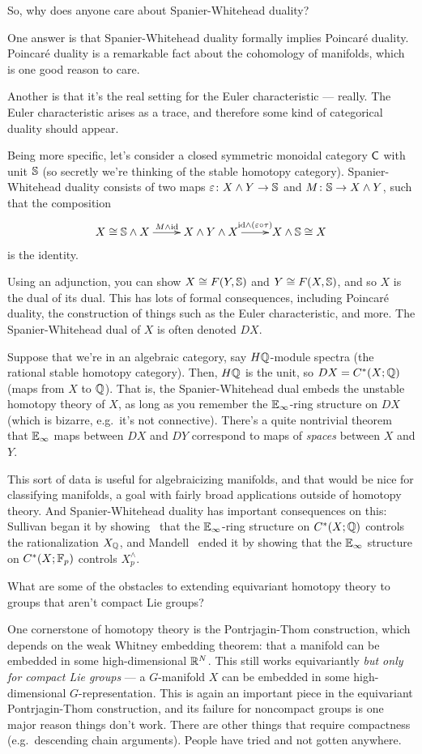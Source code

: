 \begin{ques}
So, why does anyone care about Spanier-Whitehead duality?
\end{ques}
One answer is that Spanier-Whitehead duality formally implies Poincaré duality. Poincaré duality is a remarkable
fact about the cohomology of manifolds, which is one good reason to care.

Another is that it's the real setting for the Euler characteristic --- really. The Euler characteristic arises as a
trace, and therefore some kind of categorical duality should appear.

Being more specific, let's consider a closed symmetric monoidal category $\mathsf C$ with unit $\mathbb S$ (so secretly we're
thinking of the stable homotopy category). Spanier-Whitehead duality consists of two maps $\varepsilon\colon X\wedge
Y\to\mathbb S$ and $M\colon \mathbb S\to X\wedge Y$, such that the composition
\[\xymatrix{
	X\cong \Sph\wedge X\ar[r]^{M\wedge\id} & X\wedge Y\wedge X\ar[r]^{\id\wedge(\e\circ\tau)} &X\wedge\Sph\cong X
}\]
is the identity.

Using an adjunction, you can show $X\cong F(Y,\mathbb S)$ and $Y\cong F(X,\mathbb S)$, and so $X$ is the dual of its dual.
This has lots of formal consequences, including Poincaré duality, the construction of things such as the Euler
characteristic, and more. The Spanier-Whitehead dual of $X$ is often denoted $DX$.

Suppose that we're in an algebraic category, say $H\mathbb Q$-module spectra (the rational stable homotopy category).
Then, $H\mathbb Q$ is the unit, so $DX = C^*(X;\mathbb Q)$ (maps from $X$ to $\mathbb Q$). That is, the Spanier-Whitehead dual embeds
the unstable homotopy theory of $X$, as long as you remember the $\mathbb E_\infty$-ring structure on $DX$ (which is
bizarre, e.g.\ it's not connective). There's a quite nontrivial theorem that $\mathbb E_\infty$ maps between $DX$ and $DY$
correspond to maps of \emph{spaces} between $X$ and $Y$.

This sort of data is useful for algebraicizing manifolds, and that would be nice for classifying manifolds, a goal
with fairly broad applications outside of homotopy theory. And Spanier-Whitehead duality has important consequences
on this: Sullivan began it by showing~\cite{SullivanQHT} that the $\mathbb E_\infty$-ring structure on $C^*(X;\mathbb Q)$
controls the rationalization $X_\mathbb Q$, and Mandell~\cite{Mandellpadic} ended it by showing that the $\mathbb E_\infty$
structure on $C^*(X;\mathbb F_p)$ controls $X_p^\wedge$.
\begin{ques}
What are some of the obstacles to extending equivariant homotopy theory to groups that aren't compact Lie groups?
\end{ques}
One cornerstone of homotopy theory is the Pontrjagin-Thom construction, which depends on the weak Whitney embedding
theorem: that a manifold can be embedded in some high-dimensional $\mathbb R^N$. This still works equivariantly \emph{but
only for compact Lie groups} --- a $G$-manifold $X$ can be embedded in some high-dimensional $G$-representation.
This is again an important piece in the equivariant Pontrjagin-Thom construction, and its failure for noncompact
groups is one major reason things don't work. There are other things that require compactness (e.g.\ descending
chain arguments). People have tried and not gotten anywhere.

